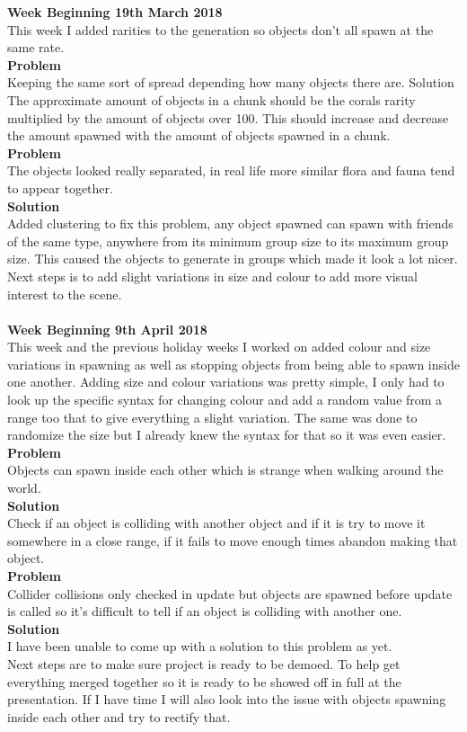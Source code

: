 \documentclass[10pt, a4paper]{article}
\begin{document}
	\textbf{Week Beginning 19th March 2018}\\
	This week I added rarities to the generation so objects don't all spawn at the same rate.\\
	\textbf{Problem}\\
	Keeping the same sort of spread depending how many objects there are.
	Solution
	The approximate amount of objects in a chunk should be the corals rarity multiplied by the amount
	of objects over 100. This should increase and decrease the amount spawned with the amount of
	objects spawned in a chunk.\\
	\textbf{Problem}\\
	The objects looked really separated, in real life more similar flora and fauna tend to appear together.\\
	\textbf{Solution}\\
	Added clustering to fix this problem, any object spawned can spawn with friends of the same type,
	anywhere from its minimum group size to its maximum group size. This caused the objects to
	generate in groups which made it look a lot nicer.\\
	Next steps is to add slight variations in size and colour to add more visual interest to the scene.\\\\
	
	\textbf{Week Beginning 9th April 2018}\\
	This week and the previous holiday weeks I worked on added colour and size variations in spawning
	as well as stopping objects from being able to spawn inside one another.
	Adding size and colour variations was pretty simple, I only had to look up the specific syntax for
	changing colour and add a random value from a range too that to give everything a slight variation.
	The same was done to randomize the size but I already knew the syntax for that so it was even
	easier.\\
	\textbf{Problem}\\
	Objects can spawn inside each other which is strange when walking around the world.\\
	\textbf{Solution}\\
	Check if an object is colliding with another object and if it is try to move it somewhere in a close
	range, if it fails to move enough times abandon making that object.\\
	\textbf{Problem}\\
	Collider collisions only checked in update but objects are spawned before update is called so it's
	difficult to tell if an object is colliding with another one.\\
	\textbf{Solution}\\
	I have been unable to come up with a solution to this problem as yet.\\
	Next steps are to make sure project is ready to be demoed. To help get everything merged together
	so it is ready to be showed off in full at the presentation. If I have time I will also look into the issue
	with objects spawning inside each other and try to rectify that.\\\\
	
\end{document}
